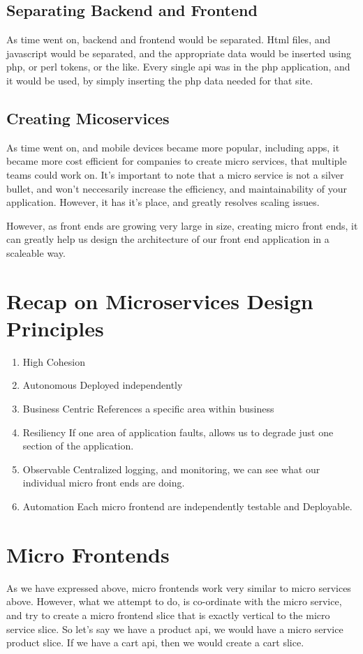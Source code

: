 \subsection{Separating Backend and Frontend}
As time went on, backend and frontend would be separated. Html files, and javascript would be separated, and the appropriate data would be inserted using php, or perl tokens, or the like. Every single api was in the php application, and it would be used, by simply inserting the php data needed for that site. 

\subsection{Creating Micoservices}
As time went on, and mobile devices became more popular, including apps, it became more cost efficient for companies to create micro services, that multiple teams could work on. It's important to note that a micro service is not a silver bullet, and won't neccesarily increase the efficiency, and maintainability of your application. However, it has it's place, and greatly resolves scaling issues. 

However, as front ends are growing very large in size, creating micro front ends, it can greatly help us design the architecture of our front end application in a scaleable way.

\section{Recap on Microservices Design Principles}
\begin{enumerate}
  \item High Cohesion 
  \item Autonomous 
Deployed independently 
  \item Business Centric
References a specific area within business 
  \item Resiliency 
If one area of application faults, allows us to degrade just one section of the application. 
  \item Observable 
Centralized logging, and monitoring, we can see what our individual micro front ends are doing.
  \item Automation 
Each micro frontend are independently testable and Deployable. 
\end{enumerate}

\section{Micro Frontends}
As we have expressed above, micro frontends work very similar to micro services above. However, what we attempt to do, is co-ordinate with the micro service, and try to create a micro frontend slice that is exactly vertical to the micro service slice. So let's say we have a product api, we would have a micro service product slice. If we have a cart api, then we would create a cart slice. 

